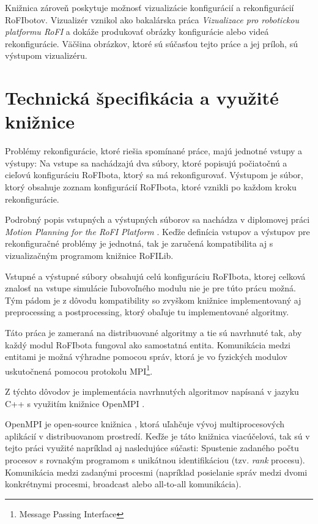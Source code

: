 \documentclass[
  digital, %
  oneside, %
  table,   %
  lof,     %
  nolot,     %
]{fithesis3}
\begin{document}
Knižnica zároveň poskytuje možnosť vizualizácie konfigurácií a rekonfigurácií RoFIbotov. Vizualizér vznikol ako bakalárska práca \textit{Vizualizace pro robotickou platformu RoFI} \cite{nausovaBachelorThesis} a dokáže produkovať obrázky konfigurácie alebo videá rekonfigurácie. Väčšina obrázkov, ktoré sú súčasťou tejto práce a jej príloh, sú výstupom vizualizéru. 

\section{Technická špecifikácia a využité knižnice}
\label{sec:libraries}
Problémy rekonfigurácie, ktoré riešia spomínané práce, majú jednotné vstupy a výstupy: Na vstupe sa nachádzajú dva súbory, ktoré popisujú počiatočnú a cieľovú konfiguráciu RoFIbota, ktorý sa má rekonfigurovať. Výstupom je súbor, ktorý obsahuje zoznam konfigurácií RoFIbota, ktoré vznikli po každom kroku rekonfigurácie. 

Podrobný popis vstupných a výstupných súborov sa nachádza v diplomovej práci \textit{Motion Planning for the RoFI Platform} \cite{vozarovaMasterThesis}. Keďže definícia vstupov a výstupov pre rekonfiguračné problémy je jednotná, tak je zaručená kompatibilita aj s vizualizačným programom knižnice RoFILib. 

Vstupné a výstupné súbory obsahujú celú konfiguráciu RoFIbota, ktorej celková znalosť na vstupe simulácie ľubovoľného modulu nie je pre túto prácu možná. Tým pádom je z dôvodu kompatibility so zvyškom knižnice implementovaný aj preprocessing a postprocessing, ktorý obaľuje tu implementované algoritmy. 

Táto práca je zameraná na distribuované algoritmy a tie sú navrhnuté tak, aby každý modul RoFIbota fungoval ako samostatná entita. Komunikácia medzi entitami je možná výhradne pomocou správ, ktorá je vo fyzických modulov uskutočnená pomocou protokolu MPI\footnote{Message Passing Interface}. 

Z týchto dôvodov je implementácia navrhnutých algoritmov napísaná v jazyku C++ s využitím knižnice OpenMPI \cite{openMPILibrary}. 

OpenMPI je open-source knižnica \cite{openMPIGit}, ktorá uľahčuje vývoj multiprocesových aplikácií v distribuovanom prostredí. Keďže je táto knižnica viacúčelová, tak sú v tejto práci využité napríklad aj nasledujúce súčasti: Spustenie zadaného počtu procesov s rovnakým programom s unikátnou identifikáciou (tzv. \textit{rank} procesu). Komunikácia medzi zadanými procesmi (napríklad posielanie správ medzi dvomi konkrétnymi procesmi, broadcast alebo all-to-all komunikácia). 
\end{document}
